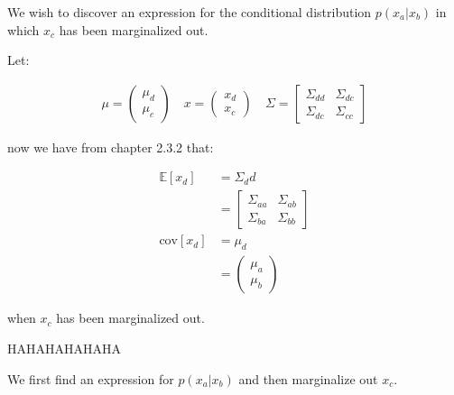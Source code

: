 We wish to discover an expression for the conditional distribution $p(x_a|x_b)$
in which $x_c$ has been marginalized out.

Let:

\begin{align*}
	\mu = \begin{pmatrix}
		\mu_d \\
		\mu_c
	\end{pmatrix} \quad
	x = \begin{pmatrix}
		x_d \\
		x_c
	\end{pmatrix} \quad
	\Sigma = \begin{bmatrix}
		\Sigma_{dd} & \Sigma_{dc} \\
		\Sigma_{dc} & \Sigma_{cc}
	\end{bmatrix}
\end{align*}

now we have from chapter 2.3.2 that:

\begin{align*}
	\mathbb{E}[x_d] &= \Sigma_dd \\
	&= \begin{bmatrix}
		\Sigma_{aa} & \Sigma_{ab} \\
		\Sigma_{ba} & \Sigma_{bb}
	   \end{bmatrix} \\
	\text{cov}[x_d] &= \mu_d \\
	&= \begin{pmatrix}
		\mu_a \\
		\mu_b
	   \end{pmatrix}
\end{align*}

when $x_c$ has been marginalized out.


HAHAHAHAHAHA

We first find an expression for
$p(x_a|x_b)$ and then marginalize out $x_c$.

